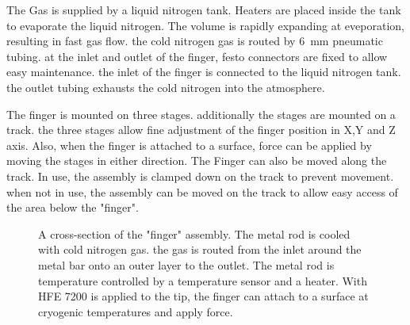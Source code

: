 The Gas is supplied by a liquid nitrogen tank. Heaters are placed inside the tank to evaporate the liquid nitrogen. The volume is rapidly expanding at eveporation, resulting in fast gas flow. the cold nitrogen gas is routed by \SI{6}{\milli\meter} pneumatic tubing. at the inlet and outlet of the finger, festo connectors are fixed to allow easy maintenance. the inlet of the finger is connected to the liquid nitrogen tank. the outlet tubing exhausts the cold nitrogen into the atmosphere.

The finger is  mounted on three stages. additionally the stages are mounted on a track. the three stages allow fine adjustment of the finger position in X,Y and Z axis. Also, when the finger is attached to a surface, force can be applied by moving the stages in either direction. The Finger can also be moved along the track. In use, the assembly is clamped down on the track to prevent movement. when not in use, the assembly can be moved on the track to allow easy access of the area below the "finger".

\begin{figure}[hbt!]
	\centering
	
	\caption{A cross-section of the "finger" assembly. The metal rod is cooled with cold nitrogen gas. the gas is routed from the inlet around the metal bar onto an outer layer to the outlet. The metal rod is temperature controlled by a temperature sensor and a heater. With HFE 7200 is applied to the tip, the finger can attach to a surface at cryogenic temperatures and apply force. }
	\label{fig:querschnittfinger}
\end{figure}

\begin{comment}
	\begin{figure}[hbt!]
		\centering
		\begin{overpic}[height=7cm]{TempFinger}%
			\thicklines
			\put(42,15){\vector(-1,0){10}}
			\put(42,15){\makebox(0,0)[lb]{ Heater,}}
			\put(42,15){\makebox(0,0)[lt]{ Temperature sensor}}
			\put(3,50){\vector(1,0){20}}
			\put(3,50){\makebox(0,0)[r]{Steel Rod }}
			\put(5,96){\vector(1,-1){10}}
			\put(5,96){\makebox(0,0)[r]{Gas inlet }}
			\put(48,96){\vector(-1,-1){10}}
			\put(48,96){\makebox(0,0)[l]{ Gas outlet}}
			\put(17,0){\vector(2,1){10}}
			\put(17,0){\makebox(0,0)[r]{Tip }}
		\end{overpic}
		\caption{Querschnitt finger}
		\label{fig:querschnittfinger}
	\end{figure}
\end{comment}


